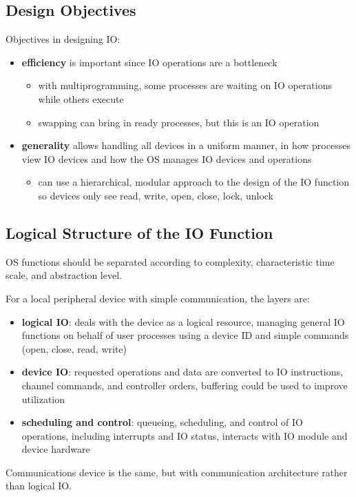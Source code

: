\documentclass[11pt]{article}
\begin{document}
\subsection{Design Objectives}
\label{sec:orgcf6e5e1}
Objectives in designing IO:
\begin{itemize}
\item \textbf{efficiency} is important since IO operations are a bottleneck
\begin{itemize}
\item with multiprogramming, some processes are waiting on IO operations while others execute
\item swapping can bring in ready processes, but this is an IO operation
\end{itemize}
\item \textbf{generality} allows handling all devices in a uniform manner, in how processes view IO devices
and how the OS manages IO devices and operations
\begin{itemize}
\item can use a hierarchical, modular approach to the design of the IO function so devices only see
read, write, open, close, lock, unlock
\end{itemize}
\end{itemize}
\subsection{Logical Structure of the IO Function}
\label{sec:orgbea3f9c}
OS functions should be separated according to complexity, characteristic time scale, and
abstraction level.

For a local peripheral device with simple communication, the layers are:
\begin{itemize}
\item \textbf{logical IO}: deals with the device as a logical resource, managing general IO functions
on behalf of user processes using a device ID and simple commands (open, close, read, write)
\item \textbf{device IO}: requested operations and data are converted to IO instructions, channel commands, and
controller orders, buffering could be used to improve utilization
\item \textbf{scheduling and control}: queueing, scheduling, and control of IO operations, including interrupts
and IO status, interacts with IO module and device hardware
\end{itemize}

Communications device is the same, but with communication architecture rather than logical IO.
\end{document}
